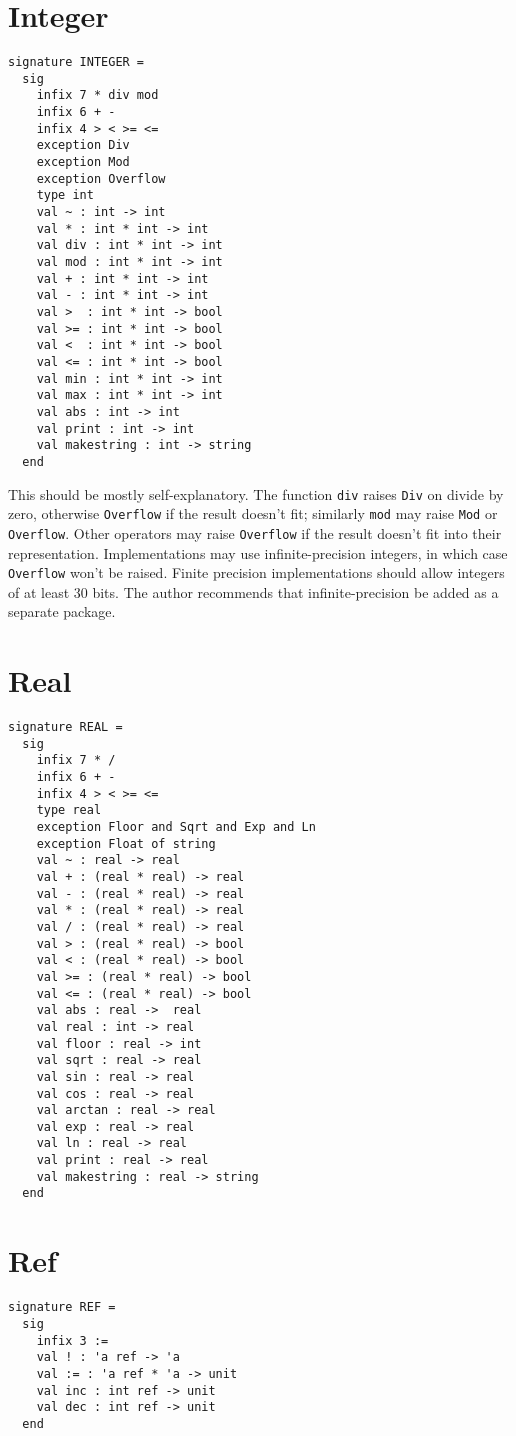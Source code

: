 \section{Integer}
\begin{verbatim}
signature INTEGER = 
  sig
    infix 7 * div mod
    infix 6 + -
    infix 4 > < >= <=
    exception Div
    exception Mod
    exception Overflow
    type int
    val ~ : int -> int
    val * : int * int -> int
    val div : int * int -> int
    val mod : int * int -> int
    val + : int * int -> int
    val - : int * int -> int
    val >  : int * int -> bool
    val >= : int * int -> bool
    val <  : int * int -> bool
    val <= : int * int -> bool
    val min : int * int -> int
    val max : int * int -> int
    val abs : int -> int
    val print : int -> int
    val makestring : int -> string
  end
\end{verbatim}
This should be mostly self-explanatory.
The function \verb"div" raises \verb"Div" on divide by zero,
otherwise \verb"Overflow" if the result doesn't fit;  similarly
\verb"mod" may raise \verb"Mod" or \verb"Overflow".  Other operators
may raise \verb"Overflow" if the result doesn't fit into their
representation.  Implementations
may use infinite-precision integers, in which case \verb"Overflow"
won't be raised.  Finite precision implementations should allow
integers of at least 30 bits.  The author recommends that
infinite-precision be added as a separate package.
\section{Real}
\begin{verbatim}
signature REAL =
  sig
    infix 7 * /
    infix 6 + -
    infix 4 > < >= <=
    type real
    exception Floor and Sqrt and Exp and Ln
    exception Float of string
    val ~ : real -> real 
    val + : (real * real) -> real 
    val - : (real * real) -> real 
    val * : (real * real) -> real 
    val / : (real * real) -> real 
    val > : (real * real) -> bool
    val < : (real * real) -> bool
    val >= : (real * real) -> bool
    val <= : (real * real) -> bool
    val abs : real ->  real
    val real : int -> real
    val floor : real -> int
    val sqrt : real -> real
    val sin : real -> real
    val cos : real -> real
    val arctan : real -> real
    val exp : real -> real
    val ln : real -> real
    val print : real -> real
    val makestring : real -> string
  end
\end{verbatim}
\section{Ref}
\begin{verbatim}
signature REF = 
  sig
    infix 3 :=
    val ! : 'a ref -> 'a
    val := : 'a ref * 'a -> unit
    val inc : int ref -> unit
    val dec : int ref -> unit
  end
\end{verbatim}

